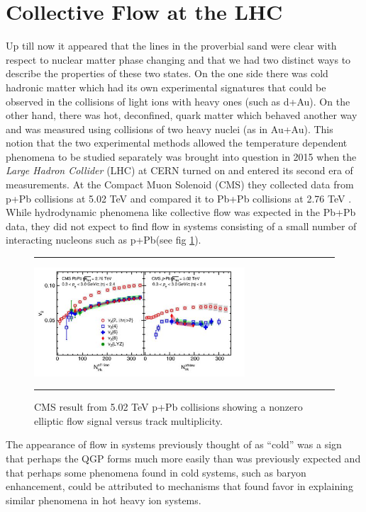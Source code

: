 \section{Collective Flow at the LHC}
Up till now it appeared that the lines in the proverbial sand were clear with respect to nuclear matter phase changing and that we had two distinct ways to describe the properties of these two states. On the one side there was cold hadronic matter which had its own experimental signatures that could be observed in the collisions of light ions with heavy ones (such as d+Au). On the other hand, there was hot, deconfined, quark matter which behaved another way and was measured using collisions of two heavy nuclei (as in Au+Au). This notion that the two experimental methods allowed the temperature dependent phenomena to be studied separately was brought into question in 2015 when the \textit{Large Hadron Collider} (LHC) at CERN turned on and entered its second era of measurements. At the Compact Muon Solenoid (CMS) they collected data from p+Pb collisions at 5.02 TeV and compared it to Pb+Pb collisions at 2.76 TeV \citep{Khachatryan:2015waa}. While hydrodynamic phenomena like collective flow was expected in the Pb+Pb data, they did not expect to find flow in systems consisting of a small number of interacting nucleons such as p+Pb(see fig \ref{fig:pPbflow}).
 
\begin{figure}[htbp!]
  \centering    \rule{35em}{0.5pt}
    \includegraphics[width=0.7\textwidth]{prevplots/pPbflowLHC.JPG}

  \caption[Elliptic Flow in p+Pb at the LHC]{CMS result from 5.02 TeV p+Pb collisions showing a nonzero elliptic flow signal versus track multiplicity. \citep{Khachatryan:2015waa}}
  \label{fig:pPbflow}    \rule{35em}{0.5pt}
\end{figure} 

The appearance of flow in systems previously thought of as ``cold'' was a sign that perhaps the QGP forms much more easily than was previously expected and that perhaps some phenomena found in cold systems, such as baryon enhancement, could be attributed to mechanisms that found favor in explaining similar phenomena in hot heavy ion systems.

